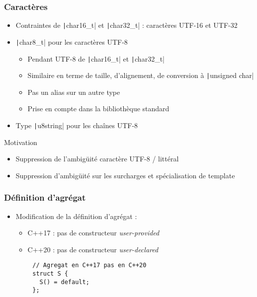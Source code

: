 \documentclass[C++.tex]{subfiles}
\begin{document}
\begin{frame}[fragile]
	\frametitle{Caractères}
	\begin{itemize}
		\item Contraintes de \texttt|char16_t| et \texttt|char32_t| : caractères UTF-16 et UTF-32


		\item \texttt|char8_t| pour les caractères UTF-8
		\begin{itemize}
			\item Pendant UTF-8 de \texttt|char16_t| et \texttt|char32_t|
			\item Similaire en terme de taille, d'alignement, de conversion à \texttt|unsigned char|
			\item Pas un alias sur un autre type
			\item Prise en compte dans la bibliothèque standard
		\end{itemize}
		\item Type \texttt|u8string| pour les chaînes UTF-8
	\end{itemize}

	\begin{block}{Motivation}
		\begin{itemize}
			\item Suppression de l'ambigüité caractère UTF-8 / littéral
			\item Suppression d'ambigüité sur les surcharges et spécialisation de template
		\end{itemize}
	\end{block}

\end{frame}

\begin{frame}[fragile]
	\frametitle{Définition d'agrégat}
	\begin{itemize}
		\item Modification de la définition d'agrégat :
		\begin{itemize}
			\item C++17 : pas de constructeur \textit{user-provided}
			\item C++20 : pas de constructeur \textit{user-declared}

		\end{itemize}
	\end{itemize}

	\begin{verbatim}
		// Agregat en C++17 pas en C++20
		struct S {
		  S() = default;
		};
	\end{verbatim}

\end{frame}
\end{document}
